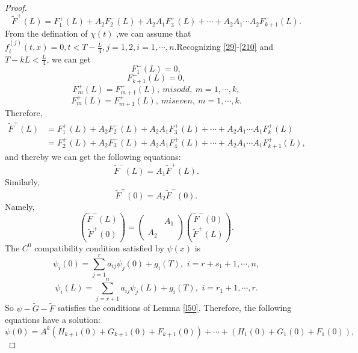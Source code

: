 \documentclass[a4paper,reqno,11pt]{amsart}
\numberwithin{equation}{section} %
\begin{document}
\begin{proof}
$$$$
$$
\tilde{F}^+  (L) =F^+ _1 (L) +A_2 F^- _2 (L) +A_2 A_1 F^+ _3 (L)  +\cdots +A_2 A_1 \cdots A_2 F^- _{k+1} (L) .
$$
From the defination of $\chi (t)$ ,we can assume that $f^{(j)}_i(t,x)=0,t < T-\frac{L}{4},j=1,2,i=1,\cdots,n$.Recognizing \eqref{29}-\eqref{210} and $T-kL < \frac{L}{4}$, we can get 
$$
F^- _{1}(L)=0,
$$
$$
F^- _{k+1}(L)=0,
$$
$$
F^+ _{m}(L) =F^+ _{m+1}(L) ,\ m is odd ,\ m=1,\cdots ,k,
$$
$$
F^+ _{m}(L) =F^+ _{m+1}(L) ,\ m is even ,\ m=1,\cdots ,k.
$$
Therefore,
\begin{equation}
	\begin{aligned}
		\tilde{F}^+  (L) &=F^+ _1 (L) +A_2 F^- _2 (L) +A_2 A_1 F^+ _3 (L)  +\cdots +A_2 A_1 \cdots A_1 F^+ _{k} (L) \\
		                 &=F^+ _2 (L) +A_2 F^- _3 (L) +A_2 A_1 F^+ _4 (L)  +\cdots +A_2 A_1 \cdots A_1 F^+ _{k+1} (L) ,
	\end{aligned}
\end{equation}
and thereby we can get the following equations:
$$
\tilde{F}^-  (L) =A_1 \tilde{F} ^+  (L) .
$$
Similarly,
$$
\tilde{F}^+  (0) =A_2 \tilde{F} ^-  (0) .
$$
Namely, 
\begin{equation}\label{compatibility condition of F}
    \binom{\tilde{F} ^{-}(L)}{\tilde{F}^{+}(0)}=\left(\begin{array}{ll} 
        & A_1 \\
        A_2 &
    \end{array}\right)\binom{\tilde{F}^{-}(0)}{\tilde{F} ^{+}(L)}.
\end{equation}
The $C^0$ compatibility condition satisfied by $\psi(x)$ is
\begin{equation}\label{21}
    \psi _i\left( 0 \right) =\sum_{j=1}^r{a_{ij}\psi _j\left( 0 \right) + g_i(T),\,\,i=r+s_1+1,\cdots ,n},
\end{equation}
\begin{equation}\label{22}
    \psi _i\left( L \right) =\sum_{j=r+1}^n{a_{ij}\psi _j\left( L \right) +g_i(T),\,\,i=r_1+1,\cdots ,r}.
\end{equation}
So $\psi -\tilde{G} -\tilde{F} $ satisfies the conditions of Lemma \ref{l50}. Therefore, the following equations have a solution:
\begin{equation}\label{c0 continuity at 0}
\psi\left( 0 \right) =A^k\left( H_{k+1}\left( 0 \right) +G_{k+1}\left( 0 \right)+F_{k+1}\left( 0 \right) \right)  +\cdots +\left( H_1\left( 0 \right) +G_1\left( 0 \right)+F_1\left( 0 \right) \right) ,
\end{equation}
\begin{equation}\label{c0 continuity at L}

\end{equation}
\end{proof}
\end{document}
